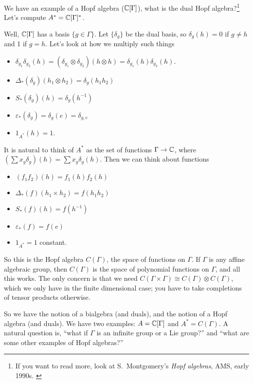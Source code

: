  We have an example of a Hopf algebra ($\mathbb{C}[\Gamma]$), what is the dual Hopf
 algebra?\footnote{ If you want to read more, look at S.~Montgomery's \textsl{Hopf
 algebras}, AMS, early 1990s. \cite{Montgomery}} Let's compute $A^*=\mathbb{C}[\Gamma]^*$.

 Well, $\mathbb{C}[\Gamma]$ has a basis
 $\{g\in \Gamma\}$. Let $\{\delta_g\}$ be the dual basis, so $\delta_g(h)=0$ if $g\neq
 h$ and 1 if $g=h$. Let's look at how we multiply such things
 \begin{itemize}
 \item $\delta_{g_1}\delta_{g_2}(h) = (\delta_{g_1}\otimes \delta_{g_2})(h\otimes
 h) = \delta_{g_1}(h)\delta_{g_2}(h)$.
 \item $\Delta_*(\delta_g)(h_1\otimes h_2) = \delta_g(h_1h_2)$
 \item $S_*(\delta_g)(h) = \delta_g(h^{-1})$
 \item $\varepsilon_*(\delta_g) = \delta_g(e) = \delta_{g,e}$
 \item $1_{A^*}(h) = 1$.
 \end{itemize}

 It is natural to think of $A^*$ as the set of functions $\Gamma\to \mathbb{C}$, where
 $(\sum x_g\delta_g)(h) = \sum x_g\delta_g(h)$. Then we can think about functions
 \begin{itemize}
 \item $(f_1 f_2)(h) = f_1(h)f_2(h)$
 \item $\Delta_*(f)(h_1\times h_2) = f(h_1h_2)$
 \item $S_*(f)(h) = f(h^{-1})$
 \item $\varepsilon_*(f) = f(e)$
 \item $1_{A^*} = 1$ constant.
 \end{itemize}
 So this is the Hopf algebra $C(\Gamma)$, the space of functions on $\Gamma$. If
 $\Gamma$ is any affine algebraic group, then $C(\Gamma)$ is the space of polynomial
 functions on $\Gamma$, and all this works. The only concern is that we need
 $C(\Gamma\times \Gamma)\cong C(\Gamma)\otimes C(\Gamma)$, which we only have in the
 finite dimensional case; you have to take completions of tensor products
 otherwise.

 So we have the notion of a bialgebra (and duals), and the notion of a Hopf algebra
 (and duals). We have two examples: $A=\mathbb{C}[\Gamma]$ and $A^*=C(\Gamma)$. A natural
 question is, ``what if $\Gamma$ is an infinite group or a Lie group?'' and ``what are
 some other examples of Hopf algebras?''

